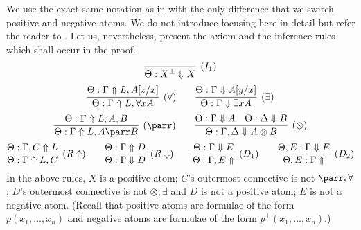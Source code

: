 \documentclass[a4paper,UKenglish,cleveref, autoref, thm-restate,pdfa]{lipics-v2021}
\newcommand{\mconj}{\otimes}
\newcommand{\mdisj}{\parr}
\begin{document}
We use the exact same notation as in \cite{Andreoli92} with the only difference that we switch positive and negative atoms. We do not introduce focusing here in detail but refer the reader to \cite{Andreoli92}. Let us, nevertheless, present the axiom and the inference rules which shall occur in the proof.
$$
\infer[(I_1)]{\Theta : X^\bot \Downarrow X}{}
$$
$$
\infer[(\forall)]{\Theta : \Gamma \Uparrow L, \forall x A}{\Theta : \Gamma \Uparrow L, A[z/x]}
\qquad
\infer[(\exists)]{\Theta : \Gamma \Downarrow \exists x A}{\Theta : \Gamma \Downarrow A[y/x]}
$$
$$
\infer[(\mdisj)]{\Theta : \Gamma \Uparrow L, A \mdisj B}{\Theta : \Gamma \Uparrow L, A,B}
\qquad
\infer[(\mconj)]{\Theta : \Gamma, \Delta \Downarrow A \mconj B}
{\Theta : \Gamma \Downarrow A & \Theta : \Delta \Downarrow B}
$$
$$
\infer[(R\Uparrow)]{\Theta : \Gamma \Uparrow L,C}{\Theta : \Gamma, C \Uparrow L}
\qquad
\infer[(R\Downarrow)]{\Theta : \Gamma \Downarrow D}{\Theta : \Gamma \Uparrow D}
\qquad
\infer[(D_1)]{\Theta : \Gamma, E \Uparrow}{\Theta : \Gamma \Downarrow E}
\qquad
\infer[(D_2)]{\Theta,E : \Gamma \Uparrow}{\Theta,E : \Gamma \Downarrow E}
$$
In the above rules, $X$ is a positive atom; $C$'s outermost connective is not $\mdisj,\forall$; $D$'s outermost connective is not $\mconj,\exists$ and $D$ is not a positive atom; $E$ is not a negative atom. (Recall that positive atoms are formulae of the form $p(x_1,\ldots,x_n)$ and negative atoms are formulae of the form $p^\bot(x_1,\ldots,x_n)$.)
\end{document}

